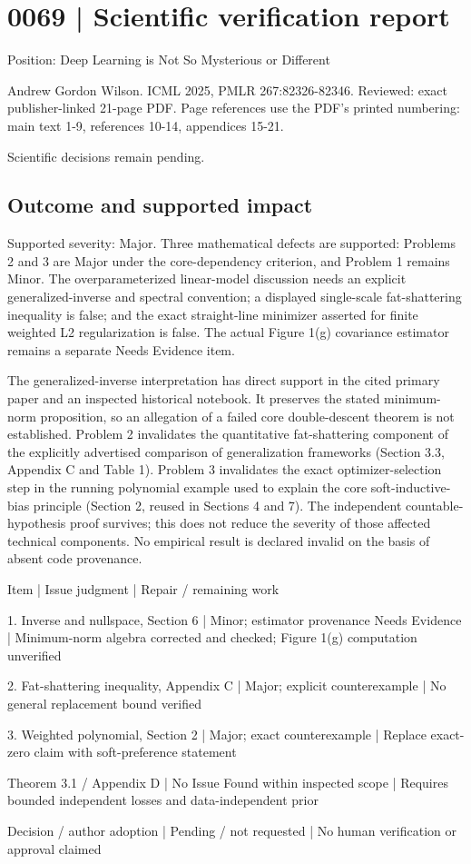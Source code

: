 \documentclass[10pt]{article}
\begin{document}
\section*{0069 | Scientific verification report}
Position: Deep Learning is Not So Mysterious or Different\par
Andrew Gordon Wilson. ICML 2025, PMLR 267:82326-82346. Reviewed: exact publisher-linked 21-page PDF. Page references use the PDF’s printed numbering: main text 1-9, references 10-14, appendices 15-21.\par
Scientific decisions remain pending.\par
\subsection*{Outcome and supported impact}
Supported severity: Major. Three mathematical defects are supported: Problems 2 and 3 are Major under the core-dependency criterion, and Problem 1 remains Minor. The overparameterized linear-model discussion needs an explicit generalized-inverse and spectral convention; a displayed single-scale fat-shattering inequality is false; and the exact straight-line minimizer asserted for finite weighted L2 regularization is false. The actual Figure 1(g) covariance estimator remains a separate Needs Evidence item.\par
The generalized-inverse interpretation has direct support in the cited primary paper and an inspected historical notebook. It preserves the stated minimum-norm proposition, so an allegation of a failed core double-descent theorem is not established. Problem 2 invalidates the quantitative fat-shattering component of the explicitly advertised comparison of generalization frameworks (Section 3.3, Appendix C and Table 1). Problem 3 invalidates the exact optimizer-selection step in the running polynomial example used to explain the core soft-inductive-bias principle (Section 2, reused in Sections 4 and 7). The independent countable-hypothesis proof survives; this does not reduce the severity of those affected technical components. No empirical result is declared invalid on the basis of absent code provenance.\par
Item | Issue judgment | Repair / remaining work\par
1. Inverse and nullspace, Section 6 | Minor; estimator provenance Needs Evidence | Minimum-norm algebra corrected and checked; Figure 1(g) computation unverified\par
2. Fat-shattering inequality, Appendix C | Major; explicit counterexample | No general replacement bound verified\par
3. Weighted polynomial, Section 2 | Major; exact counterexample | Replace exact-zero claim with soft-preference statement\par
Theorem 3.1 / Appendix D | No Issue Found within inspected scope | Requires bounded independent losses and data-independent prior\par
Decision / author adoption | Pending / not requested | No human verification or approval claimed\par
\end{document}
